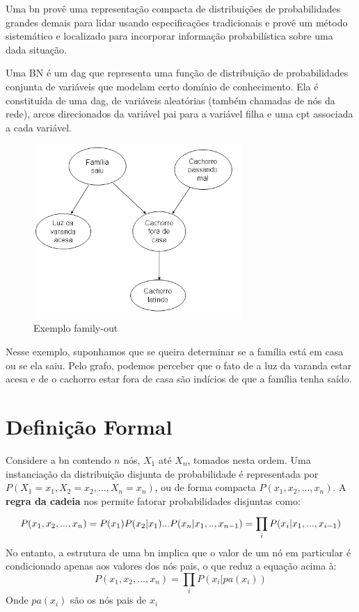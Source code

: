 
Uma \gls{bn} provê uma representação compacta de distribuições de probabilidades grandes demais para lidar usando especificações tradicionais e provê um método sistemático e localizado para incorporar informação probabilística sobre uma dada situação.

Uma BN é um \gls{dag} que representa uma função de distribuição de probabilidades conjunta de variáveis que modelam certo domínio de conhecimento. Ela é constituída de uma \gls{dag}, de variáveis aleatórias (também chamadas de nós da rede), arcos direcionados da variável pai para a variável filha e uma \gls{cpt} associada a cada variável.
\begin{figure}[H]
	\centering
	\includegraphics[width = 300px]{figuras/BN1}
	\caption[Exemplo family-out]{Exemplo family-out}
	\label{fig:familyBN}
\end{figure}

Nesse exemplo, suponhamos que se queira determinar se a família está em casa ou se ela saiu. Pelo grafo, podemos perceber que o fato de a luz da varanda estar acesa e de o cachorro estar fora de casa são indícios de que a família tenha saído. 

\section{Definição Formal}
Considere a \gls{bn} contendo $n$ nós, $X_1$ até $X_n$, tomados nesta ordem. Uma instanciação da distribuição disjunta de probabilidade é representada por $P(X_1 = x_1, X_2 = x_2, ... , X_n = x_n)$, ou de forma compacta $P(x_1, x_2, ..., x_n)$. A \textbf{regra da cadeia} nos permite fatorar probabilidades disjuntas como:
\begin{equation}
	P(x_1, x_2, ..., x_n) = P(x_1)P(x_2|x_1)...P(x_n|x_1,..,x_{n-1})\\
	= \prod_{i}^{}P(x_i|x_1,...,x_{i-1})
\end{equation}
No entanto, a estrutura de uma \gls{bn} implica que o valor de um nó em particular é condicionado apenas aos valores dos nós pais, o que reduz a equação acima à:
\begin{equation}
P(x_1, x_2, ..., x_n) = \prod_i P(x_i|pa(x_i))
\end{equation}
Onde $pa(x_i)$ são os nós pais de $x_i$

